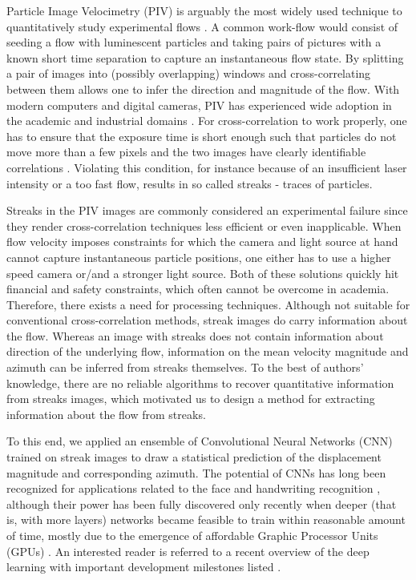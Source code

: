 \documentclass{svjour3}                     %
\begin{document}
Particle Image Velocimetry (PIV) is arguably the most widely used technique to quantitatively study experimental flows \cite{westerweel1997fundamentals, raffel2018particle}. A common work-flow would consist of seeding a flow with luminescent particles and taking pairs of pictures with a known short time separation to capture an instantaneous flow state. By splitting a pair of images into (possibly overlapping) windows and cross-correlating between them allows one to infer the direction and magnitude of the flow. With modern computers and digital cameras, PIV has experienced wide adoption in the academic and industrial domains \cite{tropea2007springer}.
For cross-correlation to work properly, one has to ensure that the exposure time is short enough such that particles do not move more than a few pixels and the two images have clearly identifiable correlations \cite{westerweel1997fundamentals}. Violating this condition, for instance because of an insufficient laser intensity or a too fast flow, results in so called streaks - traces of particles.

Streaks in the PIV images are commonly considered an experimental failure since they render cross-correlation techniques less efficient or even inapplicable. When flow velocity imposes constraints for which the camera and light source at hand cannot capture instantaneous particle positions, one either has to use a higher speed camera or/and a stronger light source. Both of these solutions quickly hit financial and safety constraints, which often cannot be overcome in academia. Therefore, there exists a need for processing techniques.
Although not suitable for conventional cross-correlation methods, streak images do carry information about the flow. Whereas an image with streaks does not contain information about direction of the underlying flow, information on the mean velocity magnitude and azimuth can be inferred from streaks themselves. To the best of authors' knowledge, there are no reliable algorithms to recover quantitative information from streaks images, which motivated us to design a method for extracting information about the flow from streaks. 

To this end, we applied an ensemble of Convolutional Neural Networks (CNN) trained on streak images to draw a statistical prediction of the displacement magnitude and corresponding azimuth. The potential of CNNs has long been recognized for applications related to the face and handwriting recognition \cite{lawrence1997face, simard2003best}, although their power has been fully discovered only recently when deeper (that is, with more layers) networks became feasible to train within reasonable amount of time, mostly due to the emergence of affordable Graphic Processor Units (GPUs) \cite{krizhevsky2012imagenet, karpathy2014large}. An interested reader is referred to a recent overview of the deep learning with important development milestones listed \cite{lecun2015deep}.
\end{document}
